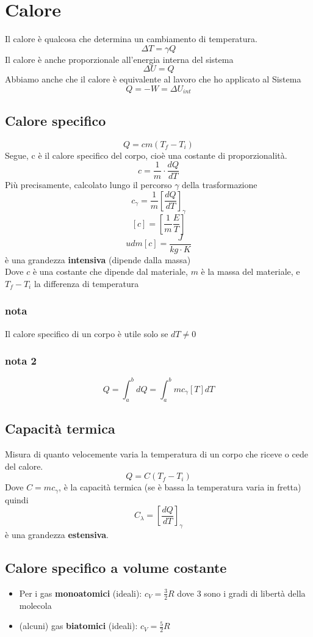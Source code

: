 \documentclass[a4paper]{report}
\begin{document}
  \section{Calore}
  Il calore è qualcosa che determina un cambiamento di temperatura.
  $$ \Delta T = \gamma Q$$
  Il calore è anche proporzionale all'energia interna del sistema
  $$ \Delta U = Q$$
  Abbiamo anche che il calore è equivalente al lavoro che ho applicato al Sistema
  $$Q = -W = \Delta U_{int}$$

  \subsection{Calore specifico}
  $$ Q = cm(T_f - T_i) $$
  Segue, c è il calore specifico del corpo, cioè una costante di proporzionalità.
  $$ c = \frac{1}{m} \cdot \frac{dQ}{dT} $$
  Più precisamente, calcolato lungo il percorso $\gamma$ della trasformazione
  $$ c_\gamma = \frac{1}{m} [\frac{dQ}{dT}]_\gamma $$
  $$ [c] = [\frac{1}{m} \frac{E}{T}]$$
  $$ udm[c] = \frac{J}{kg\cdot K} $$
  è una grandezza \textbf{intensiva} (dipende dalla massa)\\
  Dove $c$ è una costante che dipende dal materiale, $m$ è la massa del materiale, e $T_f - T_i$ la differenza di temperatura
  \subsubsection{nota}
  Il calore specifico di un corpo è utile solo se $dT \neq 0$
  \subsubsection{nota 2}
  $$ Q = \int_{a}^b dQ = \int_a^b m c_\gamma[T] dT $$

  \subsection{Capacità termica}
  Misura di quanto velocemente varia la temperatura di un corpo che riceve o cede del calore.
  $$ Q = C(T_f-T_i) $$
  Dove $C = mc_\gamma$, è la capacità termica (se è bassa la temperatura varia in fretta) quindi
  $$ C_\lambda = [\frac{dQ}{dT}]_\gamma $$
  è una grandezza \textbf{estensiva}.
  \subsection{Calore specifico a volume costante}
  \begin{itemize}
    \item Per i gas \textbf{monoatomici} (ideali):  $c_V = \frac{3}{2}R$ dove $3$ sono i gradi di libertà della molecola
    \item (alcuni) gas \textbf{biatomici} (ideali):  $c_V = \frac{5}{2}R$
  \end{itemize}
\end{document}

